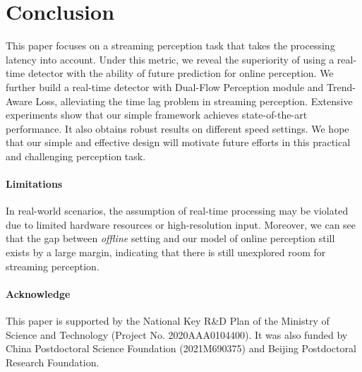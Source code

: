 \documentclass[10pt,twocolumn,letterpaper]{article}
\begin{document}
\section{Conclusion}
This paper focuses on a streaming perception task that takes the processing latency into account. Under this metric, we reveal the superiority of using a real-time detector with the ability of future prediction for online perception. We further build a real-time detector with Dual-Flow Perception module and Trend-Aware Loss, alleviating the time lag problem in streaming perception. Extensive experiments show that our simple framework achieves state-of-the-art performance. It also obtains robust results on different speed settings. We hope that our simple and effective design will motivate future efforts in this practical and challenging perception task.

\paragraph{Limitations}
In real-world scenarios, the assumption of real-time processing may be violated due to limited hardware resources or high-resolution input. Moreover, we can see that the gap between \emph{offline} setting and our model of online perception still exists by a large margin, indicating that there is still unexplored room for streaming perception.

\paragraph{Acknowledge} This paper is supported by the National Key R\&D Plan of the Ministry of Science and Technology (Project No. 2020AAA0104400). It was also funded by China Postdoctoral Science Foundation (2021M690375) and Beijing Postdoctoral Research Foundation.       

{\small


}
\end{document}
